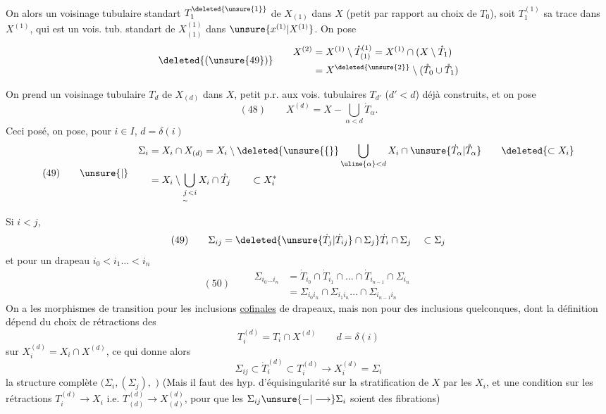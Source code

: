 On  alors un voisinage tubulaire
standart  $T_1^{\deleted{\unsure{1}}}$ de $X_{(1)}$ dans $X$
(petit par rapport au choix de $T_0$), soit $T_1^{(1)}$ sa trace dans
$X^{(1)}$, qui est un vois. tub. standart de $X^{(1)}_{(1)}$ dans
$\unsure{x^{(1)}|X^{(1)}}$. On pose
\[
\deleted{(\unsure{49})}\qquad
\begin{aligned}
X^{(2)}&=X^{(1)}\setminus\mathring T^{(1)}_{(1)}
=X^{(1)}\cap(X\setminus\mathring T_1)\\
&=X^{\deleted{\unsure{2}}}\setminus(\mathring T_0\cup\mathring T_1)
\end{aligned}
\]

On prend un voisinage tubulaire $T_d$ de $X_{(d)}$ dans $X$,
petit p.r. aux vois. tubulaires $T_{d'}$ ($d'<d$) déjà construits,
et on pose
\[
(48)\qquad X^{(d)}=X-\bigcup_{\alpha<d}\mathring T_\alpha.
\]
Ceci posé, on pose, pour $i\in I$, $d=\delta(i)$
\[
(49)\qquad\unsure{|}\quad
\begin{aligned}
\Sigma_i&=X_i\cap X_{(d)}
=X_i\setminus\deleted{\unsure{\{}}\bigcup_{\uline{\alpha}<d}X_i\cap
\unsure{\dot T_\alpha|\mathring T_\alpha}
\qquad\deleted{\subset X_i}\\
&=X_i\setminus\bigcup_{\underset{\sim}{j}<i}X_i\cap\mathring T_j
\qquad\subset X_i^*
\end{aligned}
\]

Si $i<j$, 
\[
(49)\qquad\Sigma_{ij}=\deleted{\unsure{\dot T_j|\dot T_{ij}}\cap\Sigma_j}
\dot T_i\cap\Sigma_j\quad\subset\Sigma_j
\]
et pour un drapeau $i_0<i_1\ldots<i_n$
\[
(50)\qquad\begin{aligned}
\Sigma_{i_0\ldots i_n}&=\dot T_{i_0}\cap\dot T_{i_1}\cap\ldots\cap
\dot T_{i_{n-1}}\cap\Sigma_{i_n}\\
&=\Sigma_{i_0i_n}\cap\Sigma_{i_1i_n}\ldots\cap\Sigma_{i_{n-1}i_n}
\end{aligned}
\]
On a  les morphismes de transition
 pour les
 inclusions \uline{cofinales} de drapeaux,
mais non pour des inclusions quelconques, dont la définition dépend
du choix de rétractions des
\[
T_i^{(d)}=T_i\cap X^{(d)}\qquad d=\delta(i)
\]
sur $X_i^{(d)}=X_i\cap X^{(d)}$, ce qui donne alors
\[
\Sigma_{ij}\subset\dot T_i^{(d)}\subset T_i^{(d)}
\longrightarrow X_i^{(d)}=\Sigma_i
\]
la structure complète
$(\Sigma_i,(\Sigma_j),$
$)$
(Mais il faut des hyp. d'équisingularité sur la
 stratification de $X$ par les $X_i$,
et une condition 
sur les rétractions
$T_i^{(d)}\longrightarrow X_i$ i.e. 
$T_{(d)}^{(d)}\longrightarrow X_{(d)}^{(d)}$,
pour que les $\Sigma_{ij}\unsure{-|\longrightarrow}\Sigma_i$ soient des fibrations)

